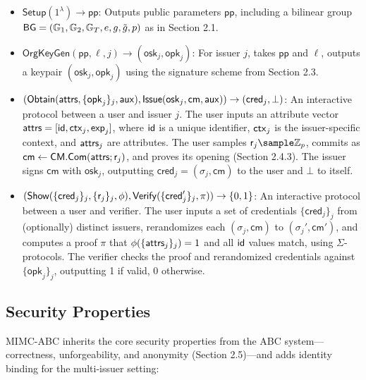\begin{definition}
    \begin{itemize}
    \item $\mathsf{Setup}(1^\lambda) \to \mathsf{pp}$: Outputs public parameters $\mathsf{pp}$, including a bilinear group $\mathsf{BG} = (\mathbb{G}_1, \mathbb{G}_2, \mathbb{G}_T, e, g, \tilde{g}, p)$ as in Section 2.1.
    
    \item $\mathsf{OrgKeyGen}(\mathsf{pp}, \ell, j) \to (\mathsf{osk}_j, \mathsf{opk}_j)$: For issuer $j$, takes $\mathsf{pp}$ and $\ell$, outputs a keypair $(\mathsf{osk}_j, \mathsf{opk}_j)$ using the signature scheme from Section 2.3.

    \item $(\mathsf{Obtain}(\mathsf{attrs}, \{\mathsf{opk}_j\}_j, \mathsf{aux}), \mathsf{Issue}(\mathsf{osk}_j, \mathsf{cm}, \mathsf{aux})) \to (\mathsf{cred}_j, \bot)$: An interactive protocol between a user and issuer $j$. The user inputs an attribute vector $\mathsf{attrs} = [\mathsf{id}, \mathsf{ctx}_j, \mathsf{exp}_j]$, where $\mathsf{id}$ is a unique identifier, $\mathsf{ctx}_j$ is the issuer-specific context, and $\mathsf{attrs}_j$ are attributes. The user samples $\usk_j \sample \Z_p$, commits as $\mathsf{cm} \gets \mathsf{CM.Com}(\mathsf{attrs}; \mathsf{r}_j)$, and proves its opening (Section 2.4.3). The issuer signs $\mathsf{cm}$ with $\mathsf{osk}_j$, outputting $\mathsf{cred}_j = (\sigma_j, \mathsf{cm})$ to the user and $\bot$ to itself.

    \item $(\mathsf{Show}(\{\mathsf{cred}_j\}_j, \{\mathsf{r}_j\}_j, \phi), \mathsf{Verify}(\{\mathsf{cred}_j'\}_j, \pi)) \to \{0,1\}$: An interactive protocol between a user and verifier. The user inputs a set of credentials $\{\mathsf{cred}_j\}_j$ from (optionally) distinct issuers, rerandomizes each $(\sigma_j, \mathsf{cm})$ to $(\sigma_j', \mathsf{cm}')$, and computes a proof $\pi$ that $\phi(\{\mathsf{attrs}_j\}_j) = 1$ and all $\mathsf{id}$ values match, using $\Sigma$-protocols. The verifier checks the proof and rerandomized credentials against $\{\mathsf{opk}_j\}_j$, outputting 1 if valid, 0 otherwise.
\end{itemize}
\end{definition}


\subsection{Security Properties}

MIMC-ABC inherits the core security properties from the ABC system—correctness, unforgeability, and anonymity (Section 2.5)—and adds identity binding for the multi-issuer setting:

